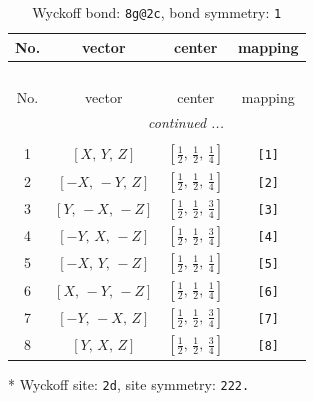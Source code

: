 \documentclass[fleqn,8pt]{jsarticle}
\begin{document}
\renewcommand{\arraystretch}{1.2}
\begin{longtable}{cccc}
\caption{Wyckoff bond: {\tt 8g@2c}, bond symmetry: {\tt 1}}
 \\
 \hline \hline
No. & vector & center & mapping \\ \hline \endfirsthead

\multicolumn{3}{l}{\tablename\ \thetable{}} \\
 \hline \hline
No. & vector & center & mapping \\ \hline \endhead

 \hline \hline
\multicolumn{3}{r}{\footnotesize\it continued ...} \\ \endfoot

 \hline \hline
\multicolumn{3}{r}{} \\ \endlastfoot

1 & $\left[ X,\, Y,\, Z \right]$ & $\left[ \frac{1}{2},\, \frac{1}{2},\, \frac{1}{4} \right]$ & {\tt [1]} \\ \hline
2 & $\left[ - X,\, - Y,\, Z \right]$ & $\left[ \frac{1}{2},\, \frac{1}{2},\, \frac{1}{4} \right]$ & {\tt [2]} \\ \hline
3 & $\left[ Y,\, - X,\, - Z \right]$ & $\left[ \frac{1}{2},\, \frac{1}{2},\, \frac{3}{4} \right]$ & {\tt [3]} \\ \hline
4 & $\left[ - Y,\, X,\, - Z \right]$ & $\left[ \frac{1}{2},\, \frac{1}{2},\, \frac{3}{4} \right]$ & {\tt [4]} \\ \hline
5 & $\left[ - X,\, Y,\, - Z \right]$ & $\left[ \frac{1}{2},\, \frac{1}{2},\, \frac{1}{4} \right]$ & {\tt [5]} \\ \hline
6 & $\left[ X,\, - Y,\, - Z \right]$ & $\left[ \frac{1}{2},\, \frac{1}{2},\, \frac{1}{4} \right]$ & {\tt [6]} \\ \hline
7 & $\left[ - Y,\, - X,\, Z \right]$ & $\left[ \frac{1}{2},\, \frac{1}{2},\, \frac{3}{4} \right]$ & {\tt [7]} \\ \hline
8 & $\left[ Y,\, X,\, Z \right]$ & $\left[ \frac{1}{2},\, \frac{1}{2},\, \frac{3}{4} \right]$ & {\tt [8]} \\
\end{longtable}
* Wyckoff site: {\tt 2d}, site symmetry: {\tt 222.}
\renewcommand{\arraystretch}{1.2}
\end{document}
